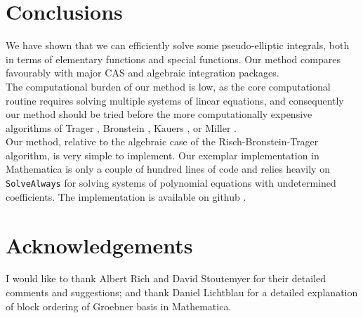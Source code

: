 \documentclass[12pt]{article}
\numberwithin{equation}{section}
\theoremstyle{definition}
\begin{document}
\section{Conclusions}

We have shown that we can efficiently solve some pseudo-elliptic integrals, both in terms of 
elementary functions and special functions. Our method compares favourably with 
major CAS and algebraic integration packages.  \\

The computational burden of our method is low, as the core computational routine requires 
solving multiple systems of linear equations, and consequently our method should be tried before the 
more computationally expensive algorithms of Trager \cite{Trager1984}, Bronstein \cite{Bronstein1990}, 
Kauers \cite{Kauers2008}, or Miller \cite{Miller2012}.\\

Our method, relative to the algebraic case of the Risch-Bronstein-Trager algorithm, is very simple to 
implement. Our exemplar implementation in Mathematica is only a couple of hundred lines of code and 
relies heavily on \texttt{SolveAlways} for solving systems of polynomial equations with undetermined 
coefficients. The implementation is available on github \cite{algebraic_github}. 

\section{Acknowledgements}
I would like to thank Albert Rich and David Stoutemyer for their detailed comments and suggestions; and 
thank Daniel Lichtblau for a detailed explanation of block ordering of Groebner basis in Mathematica. 


\end{document}
